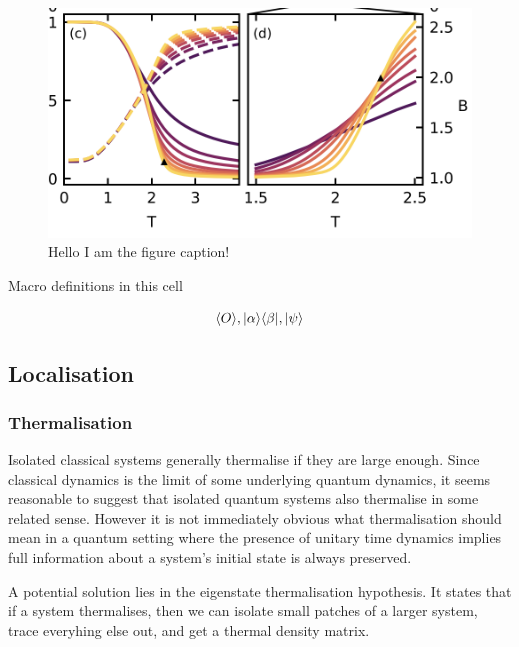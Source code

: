 \begin{figure}
\hypertarget{fig:binder}{%
\centering
\includegraphics[width=1\textwidth,height=\textheight]{figure_code/fk_chapter/binder.png}
\caption{Hello I am the figure caption!}\label{fig:binder}
}
\end{figure}

Macro definitions in this cell \[
\newcommand{\expval}[1]{\langle #1 \rangle}
\newcommand{\ket}[1]{|#1\rangle}
\newcommand{\bra}[1]{\langle#1|}
\newcommand{\op}[2]{|#1\rangle \langle#2|}
\]

\[
\expval{O}, \op{\alpha}{\beta}, \ket{\psi}
\]

\hypertarget{localisation-1}{%
\subsection{Localisation}\label{localisation-1}}

\hypertarget{thermalisation}{%
\subsubsection{Thermalisation}\label{thermalisation}}

Isolated classical systems generally thermalise if they are large enough. Since classical dynamics is the limit of some underlying quantum dynamics, it seems reasonable to suggest that isolated quantum systems also thermalise in some related sense. However it is not immediately obvious what thermalisation should mean in a quantum setting where the presence of unitary time dynamics implies full information about a system's initial state is always preserved.

A potential solution lies in the eigenstate thermalisation hypothesis. It states that if a system thermalises, then we can isolate small patches of a larger system, trace everyhing else out, and get a thermal density matrix.

